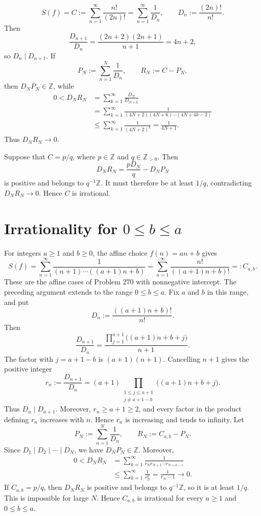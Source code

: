 \documentclass[12pt]{article}
\begin{document}
\[
S(f)=C:=\sum_{n=1}^{\infty}\frac{n!}{(2n)!}
=\sum_{n=1}^{\infty}\frac1{D_n},
\qquad
D_n:=\frac{(2n)!}{n!}.
\]
Then
\[
\frac{D_{n+1}}{D_n}
=\frac{(2n+2)(2n+1)}{n+1}
=4n+2,
\]
so $D_n\mid D_{n+1}$. If
\[
P_N:=\sum_{n=1}^{N}\frac1{D_n},
\qquad
R_N:=C-P_N,
\]
then $D_NP_N\in\mathbb Z$, while
\[
\begin{aligned}
0<D_NR_N
&=\sum_{k=1}^{\infty}\frac{D_N}{D_{N+k}}\\
&=\sum_{k=1}^{\infty}
\frac1{(4N+2)(4N+6)\cdots(4N+4k-2)}\\
&\leq\sum_{k=1}^{\infty}\frac1{(4N+2)^k}
=\frac1{4N+1}.
\end{aligned}
\]
Thus $D_NR_N\to0$.

Suppose that $C=p/q$, where $p\in\mathbb Z$ and $q\in\mathbb Z_{>0}$. Then
\[
D_NR_N=\frac{pD_N}{q}-D_NP_N
\]
is positive and belongs to $q^{-1}\mathbb Z$. It must therefore be at least $1/q$, contradicting $D_NR_N\to0$. Hence $C$ is irrational.

\section{Irrationality for \texorpdfstring{$0\leq b\leq a$}{0 <= b <= a}}
\label{sec:irrationality-range}

For integers $a\geq1$ and $b\geq0$, the affine choice $f(n)=an+b$ gives
\[
S(f)=\sum_{n=1}^{\infty}\frac1{(n+1)\cdots((a+1)n+b)}
=\sum_{n=1}^{\infty}\frac{n!}{((a+1)n+b)!}
=:C_{a,b}.
\]
These are the affine cases of Problem 270 with nonnegative intercept. The preceding argument extends to the range $0\leq b\leq a$. Fix $a$ and $b$ in this range, and put
\[
D_n:=\frac{((a+1)n+b)!}{n!}.
\]
Then
\[
\frac{D_{n+1}}{D_n}
=\frac{\displaystyle\prod_{j=1}^{a+1}\bigl((a+1)n+b+j\bigr)}{n+1}.
\]
The factor with $j=a+1-b$ is $(a+1)(n+1)$. Cancelling $n+1$ gives the positive integer
\[
r_n:=\frac{D_{n+1}}{D_n}
=(a+1)
\prod_{\substack{1\leq j\leq a+1\\j\neq a+1-b}}
\bigl((a+1)n+b+j\bigr).
\]
Thus $D_n\mid D_{n+1}$. Moreover, $r_n\geq a+1\geq2$, and every factor in the product defining $r_n$ increases with $n$. Hence $r_n$ is increasing and tends to infinity. Let
\[
P_N:=\sum_{n=1}^{N}\frac1{D_n},
\qquad
R_N:=C_{a,b}-P_N.
\]
Since $D_1\mid D_2\mid\cdots\mid D_N$, we have $D_NP_N\in\mathbb Z$. Moreover,
\[
\begin{aligned}
0<D_NR_N
&=\sum_{k=1}^{\infty}
\frac1{r_Nr_{N+1}\cdots r_{N+k-1}}\\
&\leq\sum_{k=1}^{\infty}\frac1{r_N^k}
=\frac1{r_N-1}
\longrightarrow0.
\end{aligned}
\]
If $C_{a,b}=p/q$, then $D_NR_N$ is positive and belongs to $q^{-1}\mathbb Z$, so it is at least $1/q$. This is impossible for large $N$. Hence $C_{a,b}$ is irrational for every $a\geq1$ and $0\leq b\leq a$.
\end{document}
